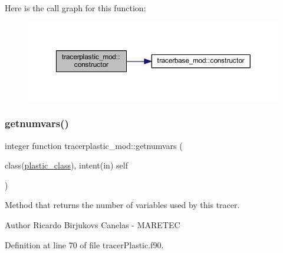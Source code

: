 Here is the call graph for this function\+:\nopagebreak
\begin{figure}[H]
\begin{center}
\leavevmode
\includegraphics[width=350pt]{namespacetracerplastic__mod_ae68444b860b6e7abf3940b0ee1bfe57a_cgraph}
\end{center}
\end{figure}
\mbox{\label{namespacetracerplastic__mod_aa5367c2562d10b5393f263394f07fa49}} 
\subsubsection{\texorpdfstring{getnumvars()}{getnumvars()}}
{\footnotesize\ttfamily integer function tracerplastic\+\_\+mod\+::getnumvars (\begin{DoxyParamCaption}\item[{class(\mbox{\hyperlink{structtracerplastic__mod_1_1plastic__class}{plastic\+\_\+class}}), intent(in)}]{self }\end{DoxyParamCaption})\hspace{0.3cm}{\ttfamily [private]}}



Method that returns the number of variables used by this tracer. 

\begin{DoxyAuthor}{Author}
Ricardo Birjukovs Canelas -\/ M\+A\+R\+E\+T\+EC 
\end{DoxyAuthor}


Definition at line 70 of file tracer\+Plastic.\+f90.


